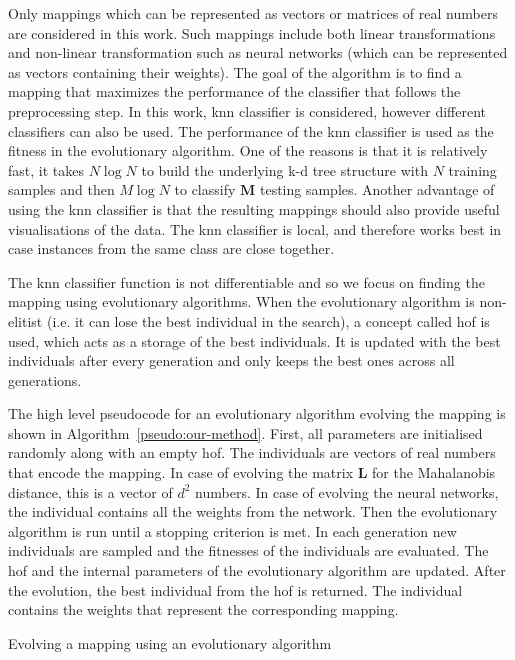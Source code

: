 Only mappings which can be represented as vectors or matrices of real numbers are considered in this work. Such mappings include both linear transformations and non-linear transformation such as neural networks (which can be represented as vectors containing their weights). The goal of the algorithm is to find a mapping that maximizes the performance of the classifier that follows the preprocessing step. In this work, \ac{knn} classifier is considered, however different classifiers can also be used. The performance of the \ac{knn} classifier is used as the fitness in the evolutionary algorithm. One of the reasons is that it is relatively fast, it takes $N\log{N}$ to build the underlying k-d tree structure with $N$ training samples and then $M \log{N}$ to classify $\bm{M}$ testing samples. Another advantage of using the \ac{knn} classifier is that the resulting mappings should also provide useful visualisations of the data. The \ac{knn} classifier is local, and therefore works best in case instances from the same class are close together.

The \ac{knn} classifier function is not differentiable and so we focus on finding the mapping using evolutionary algorithms. When the evolutionary algorithm is non-elitist (i.e. it can lose the best individual in the search), a concept called \ac{hof} is used, which acts as a storage of the best individuals. It is updated with the best individuals after every generation and only keeps the best ones across all generations.

The high level pseudocode for an evolutionary algorithm evolving the mapping is shown in Algorithm~\ref{pseudo:our-method}. First, all parameters are initialised randomly along with an empty \ac{hof}. The individuals are vectors of real numbers that encode the mapping. In case of evolving the matrix $\bm{L}$ for the Mahalanobis distance, this is a vector of $d^2$ numbers. In case of evolving the neural networks, the individual contains all the weights from the network. Then the evolutionary algorithm is run until a stopping criterion is met. In each generation new individuals are sampled and the fitnesses of the individuals are evaluated. The \ac{hof} and the internal parameters of the evolutionary algorithm are updated. After the evolution, the best individual from the \ac{hof} is returned. The individual contains the weights that represent the corresponding mapping.

\begin{algorithm}[t]
\caption{Evolving a mapping using an evolutionary algorithm} \label{pseudo:our-method}
\DontPrintSemicolon
\LinesNumbered
{}
\end{algorithm} 

